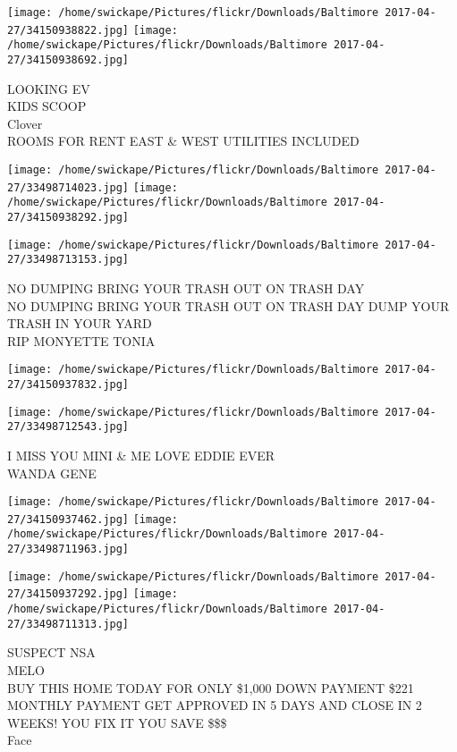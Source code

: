 \documentclass[10pt,letterpaper]{article}
\begin{document}
\texttt{[image: /home/swickape/Pictures/flickr/Downloads/Baltimore 2017-04-27/34150938822.jpg]}
\texttt{[image: /home/swickape/Pictures/flickr/Downloads/Baltimore 2017-04-27/34150938692.jpg]}

LOOKING EV\\
KIDS SCOOP\\
Clover\\
ROOMS FOR RENT EAST \& WEST UTILITIES INCLUDED\\
\pagebreak

\texttt{[image: /home/swickape/Pictures/flickr/Downloads/Baltimore 2017-04-27/33498714023.jpg]}
\texttt{[image: /home/swickape/Pictures/flickr/Downloads/Baltimore 2017-04-27/34150938292.jpg]}

\vspace{0.25in}
\texttt{[image: /home/swickape/Pictures/flickr/Downloads/Baltimore 2017-04-27/33498713153.jpg]}

NO DUMPING BRING YOUR TRASH OUT ON TRASH DAY\\
NO DUMPING BRING YOUR TRASH OUT ON TRASH DAY DUMP YOUR TRASH IN YOUR YARD\\
RIP MONYETTE TONIA\\
\pagebreak

\texttt{[image: /home/swickape/Pictures/flickr/Downloads/Baltimore 2017-04-27/34150937832.jpg]}

\vspace{0.25in}
\texttt{[image: /home/swickape/Pictures/flickr/Downloads/Baltimore 2017-04-27/33498712543.jpg]}

I MISS YOU MINI \& ME LOVE EDDIE EVER\\
WANDA GENE\\
\pagebreak

\texttt{[image: /home/swickape/Pictures/flickr/Downloads/Baltimore 2017-04-27/34150937462.jpg]}
\texttt{[image: /home/swickape/Pictures/flickr/Downloads/Baltimore 2017-04-27/33498711963.jpg]}

\texttt{[image: /home/swickape/Pictures/flickr/Downloads/Baltimore 2017-04-27/34150937292.jpg]}
\texttt{[image: /home/swickape/Pictures/flickr/Downloads/Baltimore 2017-04-27/33498711313.jpg]}

SUSPECT NSA\\
MELO\\
BUY THIS HOME TODAY FOR ONLY \$1,000 DOWN PAYMENT \$221 MONTHLY PAYMENT GET APPROVED IN 5 DAYS AND CLOSE IN 2 WEEKS!  YOU FIX IT YOU SAVE \$\$\$\\
Face\\
\pagebreak
\end{document}
